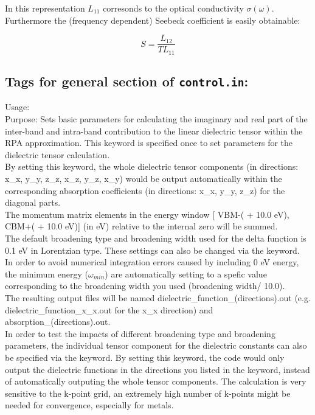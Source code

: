 In this representation $L_{11}$ corresonds to the optical conductivity $\sigma(\omega)$. Furthermore the (frequency dependent) Seebeck coefficient is easily obtainable: 

\begin{equation}
S = \frac{L_{12}}{TL_{11}}
\end{equation}
\newpage


\subsection*{Tags for general section of \texttt{control.in}:}
{
  \noindent
  Usage:     \\[1.0ex]
  Purpose: Sets basic parameters for calculating the imaginary and real part of the inter-band and intra-band contribution to the linear dielectric tensor within the RPA approximation.  This keyword is specified once to set parameters for the dielectric tensor calculation.\\ 
  
  By setting this keyword, the whole dielectric tensor components (in directions: x\_x, y\_y, z\_z, x\_z, y\_z, x\_y) would be output automatically within the corresponding absorption coefficients (in directions: x\_x, y\_y, z\_z) for the diagonal parts.  \\ 
  The momentum matrix elements in the energy window [ VBM-( + 10.0 eV), CBM+( + 10.0 eV)] (in eV) relative to the internal zero will be summed. \\ 
  The default broadening type and broadening width used for the delta function is 0.1 eV in Lorentzian type. These settings can also be changed via the  keyword. \\
  In order to avoid numerical integration  errors caused by including 0 eV energy, the minimum energy ($\omega_{min}$) are automatically setting to a spefic value corresponding to the broadening width you used (broadening width/ 10.0). \\
  The resulting output files will be named dielectric\_function\_(directions).out (e.g. dielectric\_function\_x\_x.out for the x\_x direction) and absorption\_(directions).out. \\ 
  In order to test the impacts of different broadening type and broadening parameters, the individual tensor component for the dielectric constants can also be specified via the  keyword. By setting this keyword, the code would only output the dielectric functions in the directions you listed in the  keyword, instead of automatically outputing the whole tensor components. 
    The calculation is very sensitive to the k-point grid, an extremely high number of k-points might be needed for convergence, especially for metals.\\[1.0ex]
}
